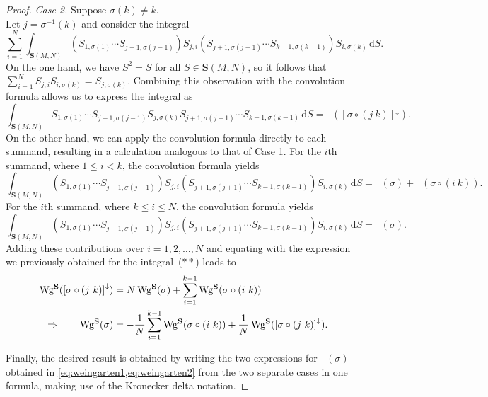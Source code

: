 \documentclass[a4paper]{article}
\theoremstyle{plain}
\numberwithin{theorem}{section}
\theoremstyle{definition}
\theoremstyle{remark}
\newcommand{\dd}{\mathrm{d}}
\renewcommand{\leq}{\leqslant}
\newcommand{\SM}{\mathbf{S}}			%
\newcommand{\sm}{S}					%
\DeclareMathOperator{\SW}{Wg^{\SM}}		%
\begin{document}
\begin{proof}
{\em Case 2.} Suppose $\sigma(k) \neq k$. \\
Let $j = \sigma^{-1}(k)$ and consider the integral
\begin{equation*} \label{eq:orthogonality2}
\sum_{i=1}^{N} \int_{\SM(M,N)} \left( \sm_{1, \sigma(1)} \cdots \sm_{j-1, \sigma(j-1)} \right) \sm_{j,i} \left( \sm_{j+1, \sigma(j+1)} \cdots \sm_{k-1, \sigma(k-1)} \right) \sm_{i, \sigma(k)} \, \dd S. \tag{$\ast\ast$}
\end{equation*}
On the one hand, we have $S^2 = S$ for all $S \in \SM(M,N)$, so it follows that $\sum_{i=1}^{N} \sm_{j,i} \sm_{i, \sigma(k)} = \sm_{j, \sigma(k)}$. Combining this observation with the convolution formula allows us to express the integral as
\[
\int_{\SM(M,N)} \sm_{1, \sigma(1)} \cdots \sm_{j-1, \sigma(j-1)} \sm_{j, \sigma(k)} \sm_{j+1, \sigma(j+1)} \cdots \sm_{k-1, \sigma(k-1)} \, \dd \sm = \SW(\left[\sigma \circ (j~k)\right]^\downarrow).
\]
On the other hand, we can apply the convolution formula directly to each summand, resulting in a calculation analogous to that of Case 1. For the $i$th summand, where $1 \leq i < k$, the convolution formula yields
\[
\int_{\SM(M,N)} \left( \sm_{1, \sigma(1)} \cdots \sm_{j-1, \sigma(j-1)} \right) \sm_{j,i} \left( \sm_{j+1, \sigma(j+1)} \cdots \sm_{k-1, \sigma(k-1)} \right) \sm_{i, \sigma(k)} \, \dd S = \SW(\sigma) + \SW(\sigma \circ (i~k)).
\]
For the $i$th summand, where $k \leq i \leq N$, the convolution formula yields
\[
\int_{\SM(M,N)} \left( \sm_{1, \sigma(1)} \cdots \sm_{j-1, \sigma(j-1)} \right) \sm_{j,i} \left( \sm_{j+1, \sigma(j+1)} \cdots \sm_{k-1, \sigma(k-1)} \right) \sm_{i, \sigma(k)} \, \dd S = \SW(\sigma).
\]
Adding these contributions over $i = 1, 2, \ldots, N$ and equating with the expression we previously obtained for the integral~($\ast\ast$) leads to
\begin{align} \label{eq:weingarten2}
\SW(\left[\sigma \circ (j~k)\right]^\downarrow) &= N \SW(\sigma) + \sum_{i=1}^{k-1} \SW(\sigma \circ (i~k)) \notag \\
\Rightarrow \qquad \SW(\sigma) &= -\frac{1}{N} \sum_{i=1}^{k-1} \SW(\sigma \circ (i~k)) + \frac{1}{N} \SW(\left[\sigma \circ (j~k)\right]^\downarrow).
\end{align}


Finally, the desired result is obtained by writing the two expressions for $\SW(\sigma)$ obtained in \cref{eq:weingarten1,eq:weingarten2} from the two separate cases in one formula, making use of the Kronecker delta notation.
\end{proof}
\end{document}
